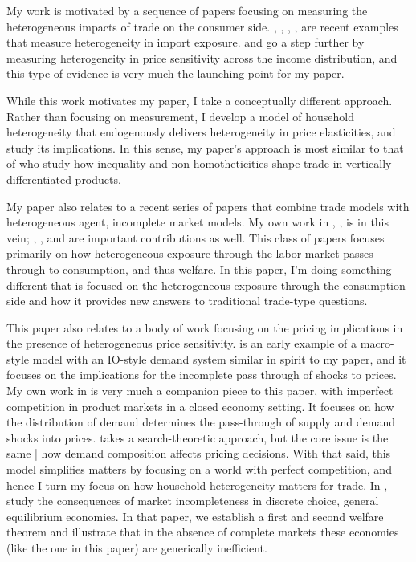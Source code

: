 \documentclass[12pt,pdftex]{article}
\begin{document}
\begin{onehalfspacing}
My work is motivated by a sequence of papers focusing on measuring the heterogeneous impacts of trade on the consumer side. \citet{fajgelbaum2016measuring}, \citet{cravino2017distributional}, \citet{carroll2020heterogeneous}, \citet{borusyak2021distributional}, \citet{jaccardtoronto} are recent examples that measure heterogeneity in import exposure. \citet{auer2022unequal} and \citet{colicev2022impact} go a step further by measuring heterogeneity in price sensitivity across the income distribution, and this type of evidence is very much the launching point for my paper.

While this work motivates my paper, I take a conceptually different approach. Rather than focusing on measurement, I develop a model of household heterogeneity that endogenously delivers heterogeneity in price elasticities, and study its implications. In this sense, my paper's approach is most similar to that of \citet{fajgelbaum2011income} who study how inequality and non-homotheticities shape trade in vertically differentiated products.

My paper also relates to a recent series of papers that combine trade models with heterogeneous agent, incomplete market models. My own work in \citet{lyon2018redistributing}, \citet{lyon2019}, \citet{waugh_consumption} is in this vein; \citet{gaston2018}, \citet{carroll2020heterogeneous}, and \citet{dvorkin2023heterogeneous} are important contributions as well. This class of papers focuses primarily on how heterogeneous exposure through the labor market passes through to consumption, and thus welfare. In this paper, I'm doing something different that is focused on the heterogeneous exposure through the consumption side and how it provides new answers to traditional trade-type questions.

This paper also relates to a body of work focusing on the pricing implications in the presence of heterogeneous price sensitivity. \citet{nakamura2010accounting} is an early example of a macro-style model with an IO-style demand system similar in spirit to my paper, and it focuses on the implications for the incomplete pass through of shocks to prices. My own work in \citet{p-iq} is very much a companion piece to this paper, with imperfect competition in product markets in a closed economy setting. It focuses on how the distribution of demand determines the pass-through of supply and demand shocks into prices.  \citet{nord2022shopping} takes a search-theoretic approach, but the core issue is the same | how demand composition affects pricing decisions. With that said, this model simplifies matters by focusing on a world with perfect competition, and hence I turn my focus on how household heterogeneity matters for trade. In \citet{mongey-waugh-2}, study the consequences of market incompleteness in discrete choice, general equilibrium economies. In that paper, we establish a first and second welfare theorem and illustrate that in the absence of complete markets these economies (like the one in this paper) are generically inefficient.


\end{onehalfspacing}
\end{document}
